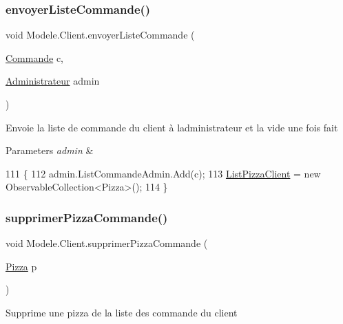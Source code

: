 \subsubsection{\texorpdfstring{envoyer\+Liste\+Commande()}{envoyerListeCommande()}}
{\footnotesize\ttfamily void Modele.\+Client.\+envoyer\+Liste\+Commande (\begin{DoxyParamCaption}\item[{\hyperlink{classModele_1_1Commande}{Commande}}]{c,  }\item[{\hyperlink{classModele_1_1Administrateur}{Administrateur}}]{admin }\end{DoxyParamCaption})\hspace{0.3cm}{\ttfamily [inline]}}



Envoie la liste de commande du client à l\textquotesingle{}administrateur et la vide une fois fait 


\begin{DoxyParams}{Parameters}
{\em admin} & \\
\hline
\end{DoxyParams}

\begin{DoxyCode}
111         \{
112             admin.ListCommandeAdmin.Add(c);
113             \hyperlink{classModele_1_1Client_a14c37e4b9ab856a1e36b7c1610a0536c}{ListPizzaClient} = \textcolor{keyword}{new} ObservableCollection<Pizza>();
114         \}
\end{DoxyCode}
\mbox{\label{classModele_1_1Client_ab99de8213e703e5742b1f2c7505fd1ea}} 
\subsubsection{\texorpdfstring{supprimer\+Pizza\+Commande()}{supprimerPizzaCommande()}}
{\footnotesize\ttfamily void Modele.\+Client.\+supprimer\+Pizza\+Commande (\begin{DoxyParamCaption}\item[{\hyperlink{classModele_1_1Pizza}{Pizza}}]{p }\end{DoxyParamCaption})\hspace{0.3cm}{\ttfamily [inline]}}



Supprime une pizza de la liste des commande du client 



